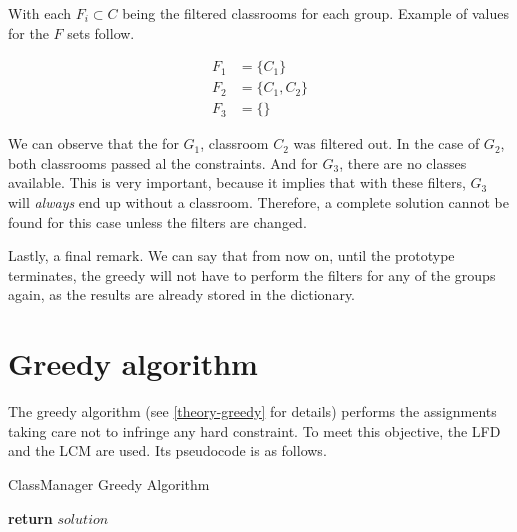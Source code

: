 With each $F_{i} \subset C$ being the filtered classrooms for each group. Example of values for the $F$ sets follow.

\begin{align}
    F_{1} &= \{ C_{1} \}\\
    F_{2} &= \{ C_{1}, C_{2} \}\\
    F_{3} &= \{ \}
\end{align}

We can observe that the for $G_{1}$, classroom $C_{2}$ was filtered out. In the case of $G_{2}$, both classrooms passed al the constraints. And for $G_{3}$, there are no classes available. This is very important, because it implies that with these filters, $G_{3}$ will \textit{always} end up without a classroom. Therefore, a complete solution cannot be found for this case unless the filters are changed.

Lastly, a final remark. We can say that from now on, until the prototype terminates, the greedy will not have to perform the filters for any of the groups again, as the results are already stored in the dictionary. 



\section{Greedy algorithm}

The greedy algorithm (see \ref{theory-greedy} for details) performs the assignments taking care not to infringe any hard constraint. To meet this objective, the LFD and the LCM are used. Its pseudocode is as follows.

\begin{algorithm}[H]
    \caption{ClassManager Greedy Algorithm}
    \begin{algorithmic}[1]
                    \Else
                    \EndIf
                \EndIf
            \EndFor
            \State \textbf{return} $solution$
        \EndProcedure
    \end{algorithmic}
\end{algorithm}

